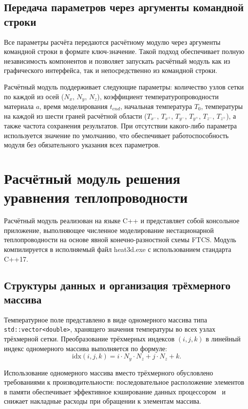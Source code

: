 \subsection{Передача параметров через аргументы командной строки}

Все параметры расчёта передаются расчётному модулю через аргументы 
командной строки в формате ключ-значение. Такой подход обеспечивает 
полную независимость компонентов и позволяет запускать расчётный модуль 
как из графического интерфейса, так и непосредственно из командной строки.

Расчётный модуль поддерживает следующие параметры: количество узлов 
сетки по каждой из осей ($N_x$, $N_y$, $N_z$), коэффициент 
температуропроводности материала $a$, время моделирования $t_{end}$, 
начальная температура $T_0$, температуры на каждой из шести граней 
расчётной области ($T_{x^-}$, $T_{x^+}$, $T_{y^-}$, $T_{y^+}$, 
$T_{z^-}$, $T_{z^+}$), а также частота сохранения результатов. 
При отсутствии какого-либо параметра используется значение по умолчанию, 
что обеспечивает работоспособность модуля без обязательного указания 
всех параметров.

\section{Расчётный модуль решения уравнения теплопроводности}

Расчётный модуль реализован на языке C++ и представляет собой 
консольное приложение, выполняющее численное моделирование 
нестационарной теплопроводности на основе явной конечно-разностной 
схемы FTCS. Модуль компилируется в исполняемый файл heat3d.exe с 
использованием стандарта C++17.

\subsection{Структуры данных и организация трёхмерного массива}

Температурное поле представлено в виде одномерного массива типа 
\texttt{std::vector<double>}, хранящего значения температуры во всех 
узлах трёхмерной сетки. Преобразование трёхмерных индексов $(i, j, k)$ 
в линейный индекс одномерного массива выполняется по формуле:
\begin{equation}
    \text{idx}(i, j, k) = i \cdot N_y \cdot N_z + j \cdot N_z + k.
\end{equation}

Использование одномерного массива вместо трёхмерного обусловлено 
требованиями к производительности: последовательное расположение 
элементов в памяти обеспечивает эффективное кэширование данных 
процессором~\cite{кудухов2014особенности} и снижает накладные расходы при обращении к элементам 
массива.

